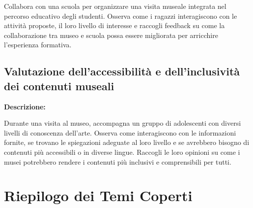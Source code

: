 \documentclass{article}
\begin{document}
Collabora con una scuola per organizzare una visita museale integrata nel percorso educativo degli studenti. Osserva come i ragazzi interagiscono con le attività proposte, il loro livello di interesse e raccogli feedback su come la collaborazione tra museo e scuola possa essere migliorata per arricchire l’esperienza formativa.

\subsection{Valutazione dell’accessibilità e dell’inclusività dei contenuti museali}

\textbf{Descrizione:}

Durante una visita al museo, accompagna un gruppo di adolescenti con diversi livelli di conoscenza dell’arte. Osserva come interagiscono con le informazioni fornite, se trovano le spiegazioni adeguate al loro livello e se avrebbero bisogno di contenuti più accessibili o in diverse lingue. Raccogli le loro opinioni su come i musei potrebbero rendere i contenuti più inclusivi e comprensibili per tutti.

\section{Riepilogo dei Temi Coperti}
\end{document}
